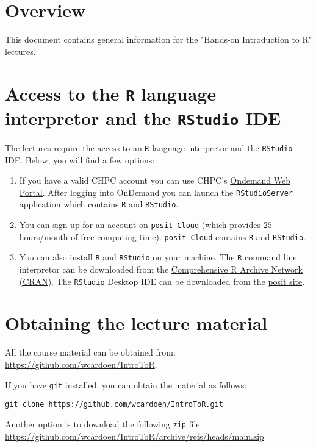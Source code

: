 \section*{Overview}

This document contains general information for the "Hands-on Introduction to R" lectures.\newline

\section{Access to the \texttt{R} language interpretor and the \texttt{RStudio} IDE}

The lectures require the access to an \texttt{R} language interpretor and the \texttt{RStudio} IDE.\newline
Below, you will find a few options:

\begin{enumerate}
\item If you have a valid CHPC account you can use CHPC's \href{http://ondemand.chpc.utah.edu/}{Ondemand Web Portal}.\newline
      After logging into OnDemand you can launch the \texttt{RStudioServer} application which contains \texttt{R} and \texttt{RStudio}.

\item You can sign up for an account on \href{https://posit.cloud/}{\texttt{posit\,Cloud}} 
	(which provides $25$ hours/month of free computing time).\newline
      \texttt{posit\,Cloud} contains \texttt{R} and \texttt{RStudio}. 

\item You can also install \texttt{R} and \texttt{RStudio} on your machine. The \texttt{R} command 
	line interpretor can be downloaded from the \href{https://cran.r-project.org/}{Comprehensive R Archive Network (CRAN)}.
      The \texttt{RStudio} Desktop IDE can be downloaded from the \href{https://posit.co/downloads/}{posit site}.
\end{enumerate}



\section{Obtaining the lecture material}
All the course material can be obtained from: \href{https://github.com/wcardoen/IntroToR}{https://github.com/wcardoen/IntroToR}.

If you have \texttt{git} installed, you can obtain the material as follows:
\begin{verbatim}
git clone https://github.com/wcardoen/IntroToR.git
\end{verbatim}
Another option is to download the following \texttt{zip} file: \newline 
\href{https://github.com/wcardoen/IntroToR/archive/refs/heads/main.zip}{https://github.com/wcardoen/IntroToR/archive/refs/heads/main.zip}

